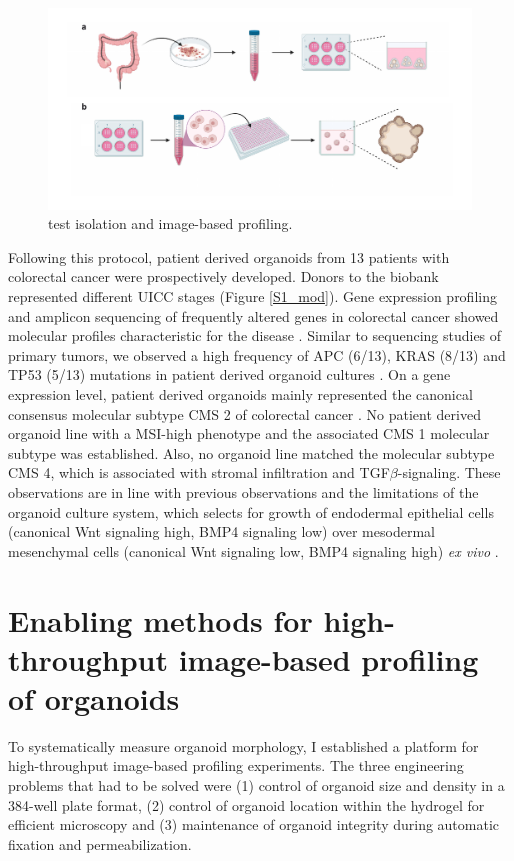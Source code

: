 \begin{flushleft}
\begin{figure}[h]
\centering
\includegraphics[width=\textwidth,
                height=\textheight,
                keepaspectratio]{figures/pdf/fig_1_1_0.pdf}
\caption{test isolation and image-based profiling.}
\label{fig_1.1.0}
\end{figure}

Following this protocol, patient derived organoids from 13 patients with colorectal cancer were prospectively developed. Donors to the biobank represented different UICC stages (Figure \ref{S1_mod}). Gene expression profiling and amplicon sequencing of frequently altered genes in colorectal cancer showed molecular profiles characteristic for the disease . Similar to sequencing studies of primary tumors, we observed a high frequency of APC (6/13), KRAS (8/13) and TP53 (5/13) mutations in patient derived organoid cultures \cite{Muzny2012-hr}. On a gene expression level, patient derived organoids mainly represented the canonical consensus molecular subtype CMS 2 of colorectal cancer \cite{Guinney2015-ex}. No patient derived organoid line with a MSI-high phenotype and the associated CMS 1 molecular subtype was established. Also, no organoid line matched the molecular subtype CMS 4, which is associated with stromal infiltration and TGF\(\beta\)-signaling. These observations are in line with previous observations \cite{Van_De_Wetering2015-ko, Schutte2017-fl} and the limitations of the organoid culture system, which selects for growth of  endodermal epithelial cells (canonical Wnt signaling high, BMP4 signaling low) over mesodermal mesenchymal cells (canonical Wnt signaling low, BMP4 signaling high) \textit{ex vivo} \cite{Sato2011-lh}.

\section{Enabling methods for high-throughput image-based profiling of organoids}
To systematically measure organoid morphology, I established a platform for high-throughput image-based profiling experiments. The three engineering problems that had to be solved were (1) control of organoid size and density in a 384-well plate format, (2) control of organoid location within the hydrogel for efficient microscopy and (3) maintenance of organoid integrity during automatic fixation and permeabilization. 


\end{flushleft}
